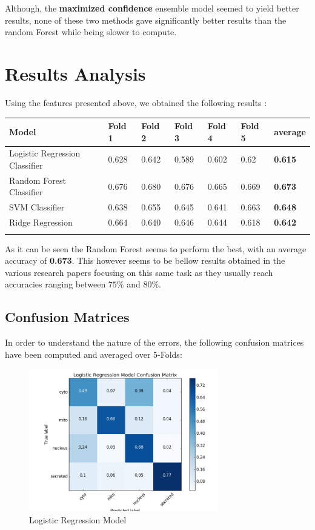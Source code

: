 \documentclass{bioinfo}
\begin{document}
\begin{methods}
Although, the  \textbf{maximized confidence} ensemble model seemed to yield better results, none of these two methods gave significantly better results than the random Forest while being slower to compute.

\newpage

\section{Results Analysis}

 Using the features presented above, we obtained the following results :


\begin{table}[H]
 {
\begin{tabular}{@{}lllllll@{}}

\toprule 
Model & Fold 1 & Fold 2 & Fold 3 & Fold 4 & Fold 5 & \textbf{average}\\
\midrule
Logistic Regression Classifier &  0.628 & 0.642 & 0.589  & 0.602 & 0.62 & \textbf{0.615}\\
Random Forest Classifier & 0.676 & 0.680 & 0.676  &  0.665 & 0.669 & \textbf{0.673} \\
SVM Classifier & 0.638 & 0.655 & 0.645  & 0.641 & 0.663 & \textbf{0.648} \\
Ridge Regression  &  0.664 & 0.640 & 0.646  & 0.644 & 0.618 & \textbf{0.642} \\
\botrule

\end{tabular}}{As it can be seen the Random Forest seems to perform the best, with an average accuracy of \textbf{0.673}. This however seems to be bellow results obtained in the various research papers focusing on this same task as they usually reach accuracies ranging between $75\%$ and $80\%$. 
}
\end{table}


\subsection{Confusion Matrices}

In order to understand the nature of the errors, the following confusion matrices have been computed and averaged over 5-Folds: \\


\begin{figure}[H]%
\centerline{\includegraphics[width=235pt]{LR_cc.png}}
\caption{Logistic Regression Model}\label{fig:01}
\end{figure}


\end{methods}
\end{document}
